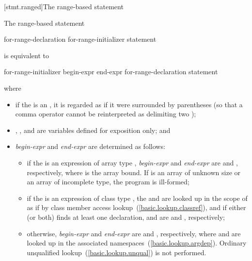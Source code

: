 [stmt.ranged]{The range-based  statement}%

\pnum
The range-based  statement

\begin{ncbnf}
 for-range-declaration \terminal{:} for-range-initializer \terminal{)} statement
\end{ncbnf}

is equivalent to

\begin{ncbnftab}
\terminal{\{}\br
\> for-range-initializer \terminal{;}\br
\> begin-expr \terminal{;}\br
\> end-expr \terminal{;}\br
\>\br
\>\>for-range-declaration \br
\>\>statement\br
\>\terminal{\}}\br
\terminal{\}}
\end{ncbnftab}

where

\begin{itemize}
\item 
if the  is an ,
it is regarded as if it were surrounded by parentheses (so that a comma operator
cannot be reinterpreted as delimiting two );

\item {}, , and  are variables defined for
exposition only; and

\item
\textit{begin-expr} and \textit{end-expr} are determined as follows:

\begin{itemize}
\item if the  is an expression of
array type , \textit{begin-expr} and \textit{end-expr} are
 and , respectively, where  is
the array bound. If  is an array of unknown size or an array of
incomplete type, the program is ill-formed;

\item if the  is an expression of
class type , the 
 and  are looked up in the scope of 
as if by class member access lookup~(\ref{basic.lookup.classref}), and if either
(or both) finds at least one declaration,  and
 are  and ,
respectively;

\item otherwise, \textit{begin-expr} and \textit{end-expr} are 
and , respectively, where  and  are looked
up in the associated namespaces~(\ref{basic.lookup.argdep}).
\enternote Ordinary unqualified lookup~(\ref{basic.lookup.unqual}) is not
performed. \exitnote
\end{itemize}
\end{itemize}

